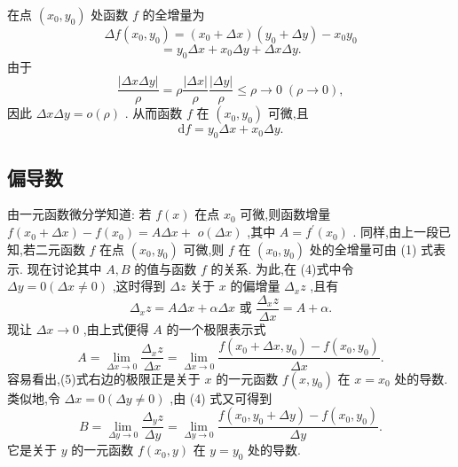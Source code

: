 \begin{solution}

\end{solution}
在点 \(\left( {{x}_{0},{y}_{0}}\right)\) 处函数 \(f\) 的全增量为
\[
{\Delta f}\left( {{x}_{0},{y}_{0}}\right)  = \left( {{x}_{0} + {\Delta x}}\right) \left( {{y}_{0} + {\Delta y}}\right)  - {x}_{0}{y}_{0}
\]
\[
= {y}_{0}{\Delta x} + {x}_{0}{\Delta y} + {\Delta x\Delta y}.
\]
由于
\[
\frac{\left| \Delta x\Delta y\right| }{\rho } = \rho \frac{\left| \Delta x\right| }{\rho }\frac{\left| \Delta y\right| }{\rho } \leq  \rho  \rightarrow  0\;\left( {\rho  \rightarrow  0}\right) ,
\]
因此 \({\Delta x\Delta y} = o\left( \rho \right)\) . 从而函数 \(f\) 在 \(\left( {{x}_{0},{y}_{0}}\right)\) 可微,且
\[
\mathrm{d}f = {y}_{0}{\Delta x} + {x}_{0}{\Delta y}.
\]
\subsection{偏导数}

由一元函数微分学知道: 若 \(f\left( x\right)\) 在点 \({x}_{0}\) 可微,则函数增量 \(f\left( {{x}_{0} + {\Delta x}}\right)  - f\left( {x}_{0}\right)  = {A\Delta x} +\)  \(o\left( {\Delta x}\right)\) ,其中 \(A = {f}^{\prime }\left( {x}_{0}\right)\) . 同样,由上一段已知,若二元函数 \(f\) 在点 \(\left( {{x}_{0},{y}_{0}}\right)\) 可微,则 \(f\) 在 \(\left( {{x}_{0},{y}_{0}}\right)\) 处的全增量可由 (1) 式表示. 现在讨论其中 \(A,B\) 的值与函数 \(f\) 的关系. 为此,在 (4)式中令 \({\Delta y} = 0\left( {{\Delta x} \neq  0}\right)\) ,这时得到 \({\Delta z}\) 关于 \(x\) 的偏增量 \({\Delta }_{x}z\) ,且有
\[
{\Delta }_{x}z = {A\Delta x} + {\alpha \Delta x}\text{ 或 }\frac{{\Delta }_{x}z}{\Delta x} = A + \alpha .
\]
现让 \({\Delta x} \rightarrow  0\) ,由上式便得 \(A\) 的一个极限表示式
\[
A = \mathop{\lim }\limits_{{{\Delta x} \rightarrow  0}}\frac{{\Delta }_{x}z}{\Delta x} = \mathop{\lim }\limits_{{{\Delta x} \rightarrow  0}}\frac{f\left( {{x}_{0} + {\Delta x},{y}_{0}}\right)  - f\left( {{x}_{0},{y}_{0}}\right) }{\Delta x}. \tag{5}
\]
容易看出,(5)式右边的极限正是关于 \(x\) 的一元函数 \(f\left( {x,{y}_{0}}\right)\) 在 \(x = {x}_{0}\) 处的导数. 类似地,令 \({\Delta x} = 0\left( {{\Delta y} \neq  0}\right)\) ,由 (4) 式又可得到
\[
B = \mathop{\lim }\limits_{{{\Delta y} \rightarrow  0}}\frac{{\Delta }_{y}z}{\Delta y} = \mathop{\lim }\limits_{{{\Delta y} \rightarrow  0}}\frac{f\left( {{x}_{0},{y}_{0} + {\Delta y}}\right)  - f\left( {{x}_{0},{y}_{0}}\right) }{\Delta y}. \tag{6}
\]
它是关于 \(y\) 的一元函数 \(f\left( {{x}_{0},y}\right)\) 在 \(y = {y}_{0}\) 处的导数.

